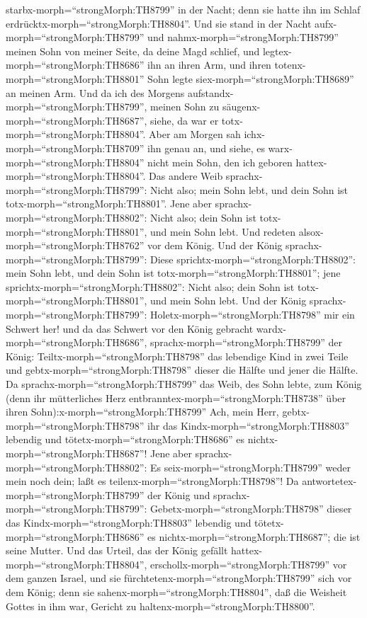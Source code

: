 starbx-morph=``strongMorph:TH8799'' in der Nacht; denn sie hatte ihn im
Schlaf erdrücktx-morph=``strongMorph:TH8804''.  Und sie
stand in der Nacht aufx-morph=``strongMorph:TH8799'' und
nahmx-morph=``strongMorph:TH8799'' meinen Sohn von meiner Seite, da
deine Magd schlief, und legtex-morph=``strongMorph:TH8686'' ihn an ihren
Arm, und ihren totenx-morph=``strongMorph:TH8801'' Sohn legte
siex-morph=``strongMorph:TH8689'' an meinen Arm.  Und da
ich des Morgens aufstandx-morph=``strongMorph:TH8799'', meinen Sohn zu
säugenx-morph=``strongMorph:TH8687'', siehe, da war er
totx-morph=``strongMorph:TH8804''. Aber am Morgen sah
ichx-morph=``strongMorph:TH8709'' ihn genau an, und siehe, es
warx-morph=``strongMorph:TH8804'' nicht mein Sohn, den ich geboren
hattex-morph=``strongMorph:TH8804''.  Das andere Weib
sprachx-morph=``strongMorph:TH8799'': Nicht also; mein Sohn lebt, und
dein Sohn ist totx-morph=``strongMorph:TH8801''. Jene aber
sprachx-morph=``strongMorph:TH8802'': Nicht also; dein Sohn ist
totx-morph=``strongMorph:TH8801'', und mein Sohn lebt. Und redeten
alsox-morph=``strongMorph:TH8762'' vor dem König.  Und der
König sprachx-morph=``strongMorph:TH8799'': Diese
sprichtx-morph=``strongMorph:TH8802'': mein Sohn lebt, und dein Sohn ist
totx-morph=``strongMorph:TH8801''; jene
sprichtx-morph=``strongMorph:TH8802'': Nicht also; dein Sohn ist
totx-morph=``strongMorph:TH8801'', und mein Sohn lebt.  Und
der König sprachx-morph=``strongMorph:TH8799'':
Holetx-morph=``strongMorph:TH8798'' mir ein Schwert her! und da das
Schwert vor den König gebracht wardx-morph=``strongMorph:TH8686'',
 sprachx-morph=``strongMorph:TH8799'' der König:
Teiltx-morph=``strongMorph:TH8798'' das lebendige Kind in zwei Teile und
gebtx-morph=``strongMorph:TH8798'' dieser die Hälfte und jener die
Hälfte.  Da sprachx-morph=``strongMorph:TH8799'' das Weib,
des Sohn lebte, zum König (denn ihr mütterliches Herz
entbranntex-morph=``strongMorph:TH8738'' über ihren
Sohn):x-morph=``strongMorph:TH8799'' Ach, mein Herr,
gebtx-morph=``strongMorph:TH8798'' ihr das
Kindx-morph=``strongMorph:TH8803'' lebendig und
tötetx-morph=``strongMorph:TH8686'' es
nichtx-morph=``strongMorph:TH8687''! Jene aber
sprachx-morph=``strongMorph:TH8802'': Es
seix-morph=``strongMorph:TH8799'' weder mein noch dein; laßt es
teilenx-morph=``strongMorph:TH8798''!  Da
antwortetex-morph=``strongMorph:TH8799'' der König und
sprachx-morph=``strongMorph:TH8799'':
Gebetx-morph=``strongMorph:TH8798'' dieser das
Kindx-morph=``strongMorph:TH8803'' lebendig und
tötetx-morph=``strongMorph:TH8686'' es
nichtx-morph=``strongMorph:TH8687''; die ist seine Mutter. 
Und das Urteil, das der König gefällt
hattex-morph=``strongMorph:TH8804'',
erschollx-morph=``strongMorph:TH8799'' vor dem ganzen Israel, und sie
fürchtetenx-morph=``strongMorph:TH8799'' sich vor dem König; denn sie
sahenx-morph=``strongMorph:TH8804'', daß die Weisheit Gottes in ihm war,
Gericht zu haltenx-morph=``strongMorph:TH8800''.

